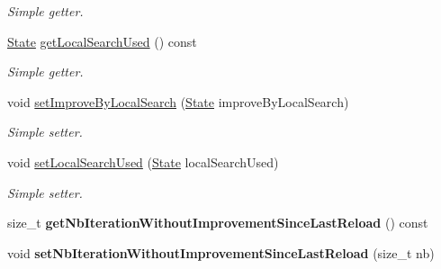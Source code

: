 \begin{DoxyCompactItemize}
\begin{DoxyCompactList}\small\item\em Simple getter. \end{DoxyCompactList}\item 
\hypertarget{classALNS__Iteration__Status_adc7244a328e029db2e08d2b033dd26cd}{\hyperlink{classALNS__Iteration__Status_a6d748b05080edeab9e82ac32c9904133}{State} \hyperlink{classALNS__Iteration__Status_adc7244a328e029db2e08d2b033dd26cd}{get\-Local\-Search\-Used} () const }\label{classALNS__Iteration__Status_adc7244a328e029db2e08d2b033dd26cd}

\begin{DoxyCompactList}\small\item\em Simple getter. \end{DoxyCompactList}\item 
\hypertarget{classALNS__Iteration__Status_a702fd3ae594f8c4721a7e4d71269ed2a}{void \hyperlink{classALNS__Iteration__Status_a702fd3ae594f8c4721a7e4d71269ed2a}{set\-Improve\-By\-Local\-Search} (\hyperlink{classALNS__Iteration__Status_a6d748b05080edeab9e82ac32c9904133}{State} improve\-By\-Local\-Search)}\label{classALNS__Iteration__Status_a702fd3ae594f8c4721a7e4d71269ed2a}

\begin{DoxyCompactList}\small\item\em Simple setter. \end{DoxyCompactList}\item 
\hypertarget{classALNS__Iteration__Status_a08a7d8a3d191f49bcbe4ccbe315ca905}{void \hyperlink{classALNS__Iteration__Status_a08a7d8a3d191f49bcbe4ccbe315ca905}{set\-Local\-Search\-Used} (\hyperlink{classALNS__Iteration__Status_a6d748b05080edeab9e82ac32c9904133}{State} local\-Search\-Used)}\label{classALNS__Iteration__Status_a08a7d8a3d191f49bcbe4ccbe315ca905}

\begin{DoxyCompactList}\small\item\em Simple setter. \end{DoxyCompactList}\item 
\hypertarget{classALNS__Iteration__Status_af90d4acaa09495f6fab3c1ae9ed681e3}{size\-\_\-t {\bfseries get\-Nb\-Iteration\-Without\-Improvement\-Since\-Last\-Reload} () const }\label{classALNS__Iteration__Status_af90d4acaa09495f6fab3c1ae9ed681e3}

\item 
\hypertarget{classALNS__Iteration__Status_a4722cfab19d9912dc51ff447a0a3fb99}{void {\bfseries set\-Nb\-Iteration\-Without\-Improvement\-Since\-Last\-Reload} (size\-\_\-t nb)}\label{classALNS__Iteration__Status_a4722cfab19d9912dc51ff447a0a3fb99}


\end{DoxyCompactItemize}
